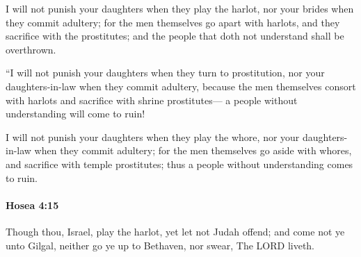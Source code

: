 			\begin{versebox}
					\item[BHS] 
					\item[LXX] 
					\item[ASV] I will not punish your daughters when they play the harlot, nor your brides when they commit adultery; for the men themselves go apart with harlots, and they sacrifice with the prostitutes; and the people that doth not understand shall be overthrown.
					\item[NIV] “I will not punish your daughters when they turn to prostitution, nor your daughters-in-law when they commit adultery, because the men themselves consort with harlots and sacrifice with shrine prostitutes— a people without understanding will come to ruin!
					\item[NRSV] I will not punish your daughters when they play the whore, nor your daughters-in-law when they commit adultery; for the men themselves go aside with whores, and sacrifice with temple prostitutes; thus a people without understanding comes to ruin.
			\end{versebox}

		\paragraph{Hosea 4:15} %
			\label{HOSEA-4-15}

			Though thou, Israel, play the harlot, yet let not Judah offend; and come not ye unto Gilgal, neither go ye up to Bethaven, nor swear, The LORD liveth.

